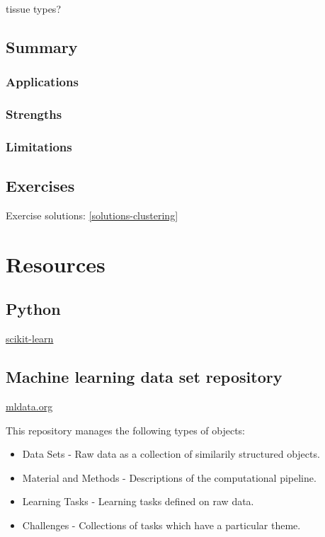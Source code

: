 \documentclass[]{book}
\providecommand{\tightlist}{%
  \setlength{\itemsep}{0pt}\setlength{\parskip}{0pt}}
\theoremstyle{definition}
\theoremstyle{definition}
\theoremstyle{definition}
\theoremstyle{remark}
\begin{document}
tissue types?

\section{Summary}\label{summary}

\subsection{Applications}\label{applications}

\subsection{Strengths}\label{strengths}

\subsection{Limitations}\label{limitations}

\section{Exercises}\label{exercises}

Exercise solutions: \ref{solutions-clustering}

\appendix


\chapter{Resources}\label{resources}

\section{Python}\label{python}

\href{http://scikit-learn.org}{scikit-learn}

\section{Machine learning data set
repository}\label{machine-learning-data-set-repository}

\href{http://mldata.org/}{mldata.org}

This repository manages the following types of objects:

\begin{itemize}
\tightlist
\item
  Data Sets - Raw data as a collection of similarily structured objects.
\item
  Material and Methods - Descriptions of the computational pipeline.
\item
  Learning Tasks - Learning tasks defined on raw data.
\item
  Challenges - Collections of tasks which have a particular theme.
\end{itemize}
\end{document}
